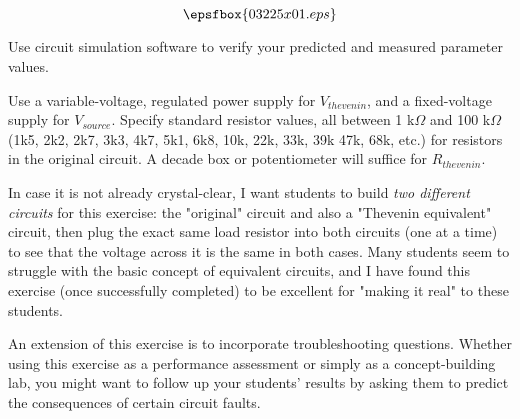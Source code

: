 

$$\epsfbox{03225x01.eps}$$

\vfil \eject






Use circuit simulation software to verify your predicted and measured parameter values.







Use a variable-voltage, regulated power supply for $V_{thevenin}$, and a fixed-voltage supply for $V_{source}$.  Specify standard resistor values, all between 1 k$\Omega$ and 100 k$\Omega$ (1k5, 2k2, 2k7, 3k3, 4k7, 5k1, 6k8, 10k, 22k, 33k, 39k 47k, 68k, etc.) for resistors in the original circuit.  A decade box or potentiometer will suffice for $R_{thevenin}$.

In case it is not already crystal-clear, I want students to build {\it two different circuits} for this exercise: the "original" circuit and also a "Thevenin equivalent" circuit, then plug the exact same load resistor into both circuits (one at a time) to see that the voltage across it is the same in both cases.  Many students seem to struggle with the basic concept of equivalent circuits, and I have found this exercise (once successfully completed) to be excellent for "making it real" to these students.

An extension of this exercise is to incorporate troubleshooting questions.  Whether using this exercise as a performance assessment or simply as a concept-building lab, you might want to follow up your students' results by asking them to predict the consequences of certain circuit faults.




